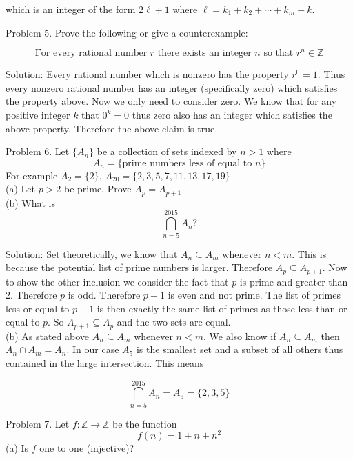 \documentclass[16 pt]{amsart}
\theoremstyle{definition}
\theoremstyle{remark}
\numberwithin{equation}{subsection}
\newcommand{\Z}{\mathbb{Z}}
\begin{document}
which is an integer of the form $2\ell +1$ where $\ell = k_1+k_2+\cdots+k_m + k$.


\newpage

Problem 5. Prove the following or give a counterexample:

\[
\text{For every rational number } r \text{ there exists an integer } n \text{ so that } r^n \in \Z
\]

\vspace{1in}

Solution: Every rational number which is nonzero has the property $r^0 = 1$.  Thus every nonzero rational number has an integer (specifically zero) which satisfies the property above.  Now we only need to consider zero.  We know that for any positive integer $k$ that $0^k = 0$ thus zero also has an integer which satisfies the above property.  Therefore the above claim is true.

\newpage

Problem 6. Let $\{A_n \}$ be a collection of sets indexed by $n>1$ where 
\[
A_n = \{\text{prime numbers less of equal to } n\}
\]
For example $A_2 = \{2\}$, $A_{20} = \{2,3,5,7,11,13,17,19\}$\\


(a) Let $p>2$ be prime. Prove $A_p = A_{p+1}$\\

(b) What is 
\[
\bigcap_{n=5}^{2015} A_n?
\]

\vspace{1in}

Solution: Set theoretically, we know that $A_n \subseteq A_m$ whenever $n<m$.  This is because the potential list of prime numbers is larger. Therefore $A_p \subseteq A_{p+1}$. Now to show the other inclusion we consider the fact that $p$ is prime and greater than 2.  Therefore $p$ is odd.  Therefore $p+1$ is even and not prime.  The list of primes less or equal to $p+1$ is then exactly the same list of primes as those less than or equal to $p$.  So $A_{p+1}\subseteq A_p$ and the two sets are equal.\\

(b) As stated above $A_n \subseteq A_m$ whenever $n<m$.  We also know if $A_n \subseteq A_m$ then $A_n \cap A_m = A_n$.  In our case $A_5$ is the smallest set and a subset of all others thus contained in the large intersection.  This means 

\[
\bigcap_{n=5}^{2015} A_n = A_5 = \{2,3,5\}
\]

\newpage

Problem 7. Let $f:\Z \rightarrow \Z$ be the function
\[
f(n) = 1 + n + n^2
\]
(a) Is $f$ one to one (injective)?\\
\end{document}

